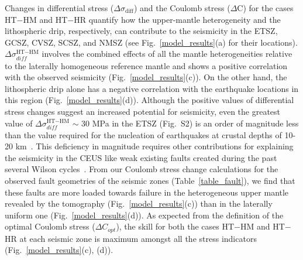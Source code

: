 \documentclass[draft,linenumbers]{agujournal2018}
\begin{document}
Changes in differential stress ($\Delta \sigma_{\text{diff}}$) and the Coulomb stress ($\Delta$C) for the cases HT$-$HM and HT$-$HR quantify how the upper-mantle heterogeneity and the lithospheric drip, respectively, can contribute to the seismicity in the ETSZ, GCSZ, CVSZ, SCSZ, and NMSZ (see Fig.~\ref{model_results}(a) for their locations). $\Delta\sigma_{diff}^{\text{HT}-\text{HM}}$ involves the combined effects of all the mantle heterogeneities relative to the laterally homogeneous reference mantle and shows a positive correlation with the observed seismicity  (Fig.~\ref{model_results}(c)). On the other hand, the lithospheric drip alone has a negative correlation with the earthquake locations in this region (Fig.~\ref{model_results}(d)). Although the positive values of differential stress changes suggest an increased potential for seismicity, even the greatest value of $\Delta\sigma_{diff}^{\text{HT}-\text{HM}}$ $\sim$ 30 MPa in the ETSZ (Fig.~S2) is an order of magnitude less than the value required for the nucleation of earthquakes at crustal depths of 10-20 km~\citep[e.g.][]{sibson1990rupture}. This deficiency in magnitude requires other contributions for explaining the seismicity in the CEUS like weak existing faults created during the past several Wilson cycles~\citep{thomas2006tectonic}. From our Coulomb stress change calculations for the observed fault geometries of the seismic zones (Table~\ref{table_fault}), we find that these faults are more loaded towards failure in the heterogeneous upper mantle revealed by the tomography (Fig.~\ref{model_results}(c))  than in the laterally uniform one (Fig.~\ref{model_results}(d)). As expected from the definition of the optimal Coulomb stress ($\Delta C_{opt}$), the skill for both the cases HT$-$HM and HT$-$HR at each seismic zone is maximum amongst all the stress indicators (Fig.~\ref{model_results}(c), (d)). 
       
       
    
\end{document}
